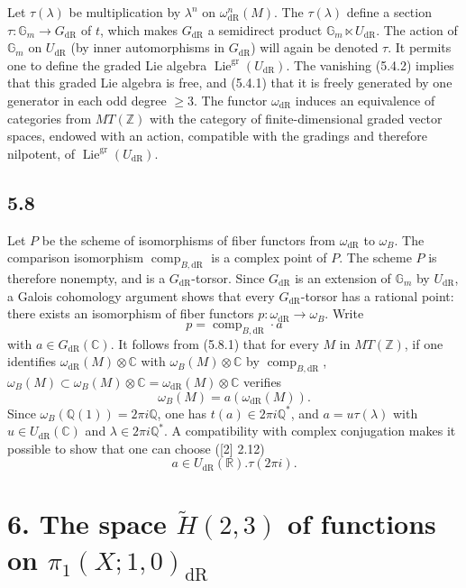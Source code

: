 \documentclass[10pt]{article}
\newcommand{\Q}{\mathbb Q}
\newcommand{\Z}{\mathbb Z}
\newcommand{\R}{\mathbb R}
\newcommand{\C}{\mathbb C}
\newcommand{\Gm}{\mathbb G_m}
\newcommand{\Lie}{\operatorname{Lie}}
\newcommand{\comp}{\operatorname{comp}}
\newcommand{\dR}{\mathrm{dR}}
\begin{document}
Let $\tau(\lambda)$ be multiplication by $\lambda^n$ on $\omega^n_{\dR}(M)$.
The $\tau(\lambda)$ define a section $\tau:\Gm\to G_{\dR}$ of $t$, which makes $G_{\dR}$ a semidirect product $\Gm\ltimes U_{\dR}$.
The action of $\Gm$ on $U_{\dR}$ (by inner automorphisms in $G_{\dR}$) will again be denoted $\tau$.
It permits one to define the graded Lie algebra $\Lie^{\mathrm{gr}}(U_{\dR})$.
The vanishing (5.4.2) implies that this graded Lie algebra is free, and (5.4.1) that it is freely generated by one generator in each odd degree $\geq3$.
The functor $\omega_{\dR}$ induces an equivalence of categories from $MT(\Z)$ with the category of finite-dimensional graded vector spaces, endowed with an action, compatible with the gradings and therefore nilpotent, of $\Lie^{\mathrm{gr}}(U_{\dR})$.

\subsection*{5.8}
Let $P$ be the scheme of isomorphisms of fiber functors from $\omega_{\dR}$ to $\omega_B$.
The comparison isomorphism $\comp_{B,\dR}$ is a complex point of $P$.
The scheme $P$ is therefore nonempty, and is a $G_{\dR}$-torsor.
Since $G_{\dR}$ is an extension of $\Gm$ by $U_{\dR}$, a Galois cohomology argument shows that every $G_{\dR}$-torsor has a rational point: there exists an isomorphism of fiber functors $p:\omega_{\dR}\to\omega_B$.
Write
\begin{equation}
 p=\comp_{B,\dR}\cdot a
\tag{5.8.1}
\end{equation}
with $a\in G_{\dR}(\C)$.
It follows from (5.8.1) that for every $M$ in $MT(\Z)$, if one identifies $\omega_{\dR}(M)\otimes\C$ with $\omega_B(M)\otimes\C$ by $\comp_{B,\dR}$, $\omega_B(M)\subset\omega_B(M)\otimes\C=\omega_{\dR}(M)\otimes\C$ verifies
\begin{equation}
 \omega_B(M)=a(\omega_{\dR}(M)).
\tag{5.8.2}
\end{equation}
Since $\omega_B(\Q(1))=2\pi i\Q$, one has $t(a)\in2\pi i\Q^*$, and $a=u\tau(\lambda)$ with $u\in U_{\dR}(\C)$ and $\lambda\in2\pi i\Q^*$.
A compatibility with complex conjugation makes it possible to show that one can choose ([2] 2.12)
\begin{equation}
 a\in U_{\dR}(\R).\tau(2\pi i).
\tag{5.8.3}
\end{equation}

\section*{6. The space $\widetilde H(2,3)$ of functions on $\pi_1(X;1,0)_{\dR}$}
\end{document}

